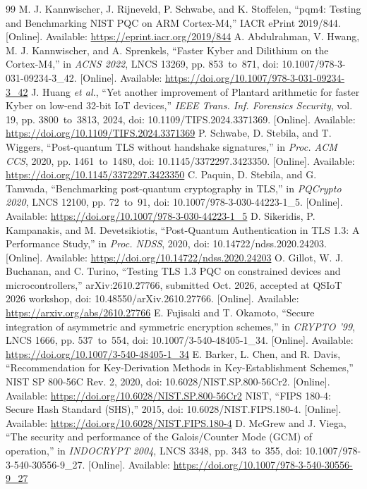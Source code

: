 \documentclass[pdflatex,sn-mathphys-num]{sn-jnl}
\begin{document}
\begin{thebibliography}{99}
 M. J. Kannwischer, J. Rijneveld, P. Schwabe, and K. Stoffelen, ``pqm4: Testing and Benchmarking NIST PQC on ARM Cortex-M4,'' IACR ePrint 2019/844. [Online]. Available: \url{https://eprint.iacr.org/2019/844}
 A. Abdulrahman, V. Hwang, M. J. Kannwischer, and A. Sprenkels, ``Faster Kyber and Dilithium on the Cortex-M4,'' in \textit{ACNS 2022}, LNCS 13269, pp. 853~to~871, doi: 10.1007/978-3-031-09234-3\_42. [Online]. Available: \url{https://doi.org/10.1007/978-3-031-09234-3_42}
 J. Huang \textit{et al.}, ``Yet another improvement of Plantard arithmetic for faster Kyber on low-end 32-bit IoT devices,'' \textit{IEEE Trans. Inf. Forensics Security}, vol. 19, pp. 3800~to~3813, 2024, doi: 10.1109/TIFS.2024.3371369. [Online]. Available: \url{https://doi.org/10.1109/TIFS.2024.3371369}
 P. Schwabe, D. Stebila, and T. Wiggers, ``Post-quantum TLS without handshake signatures,'' in \textit{Proc. ACM CCS}, 2020, pp. 1461~to~1480, doi: 10.1145/3372297.3423350. [Online]. Available: \url{https://doi.org/10.1145/3372297.3423350}
 C. Paquin, D. Stebila, and G. Tamvada, ``Benchmarking post-quantum cryptography in TLS,'' in \textit{PQCrypto 2020}, LNCS 12100, pp. 72~to~91, doi: 10.1007/978-3-030-44223-1\_5. [Online]. Available: \url{https://doi.org/10.1007/978-3-030-44223-1_5}
 D. Sikeridis, P. Kampanakis, and M. Devetsikiotis, ``Post-Quantum Authentication in TLS 1.3: A Performance Study,'' in \textit{Proc. NDSS}, 2020, doi: 10.14722/ndss.2020.24203. [Online]. Available: \url{https://doi.org/10.14722/ndss.2020.24203}
 O. Gillot, W. J. Buchanan, and C. Turino, ``Testing TLS 1.3 PQC on constrained devices and microcontrollers,'' arXiv:2610.27766, submitted Oct. 2026, accepted at QSIoT 2026 workshop, doi: 10.48550/arXiv.2610.27766. [Online]. Available: \url{https://arxiv.org/abs/2610.27766}
 E. Fujisaki and T. Okamoto, ``Secure integration of asymmetric and symmetric encryption schemes,'' in \textit{CRYPTO '99}, LNCS 1666, pp. 537~to~554, doi: 10.1007/3-540-48405-1\_34. [Online]. Available: \url{https://doi.org/10.1007/3-540-48405-1_34}
 E. Barker, L. Chen, and R. Davis, ``Recommendation for Key-Derivation Methods in Key-Establishment Schemes,'' NIST SP 800-56C Rev. 2, 2020, doi: 10.6028/NIST.SP.800-56Cr2. [Online]. Available: \url{https://doi.org/10.6028/NIST.SP.800-56Cr2}
 NIST, ``FIPS 180-4: Secure Hash Standard (SHS),'' 2015, doi: 10.6028/NIST.FIPS.180-4. [Online]. Available: \url{https://doi.org/10.6028/NIST.FIPS.180-4}
 D. McGrew and J. Viega, ``The security and performance of the Galois/Counter Mode (GCM) of operation,'' in \textit{INDOCRYPT 2004}, LNCS 3348, pp. 343~to~355, doi: 10.1007/978-3-540-30556-9\_27. [Online]. Available: \url{https://doi.org/10.1007/978-3-540-30556-9_27}

\end{thebibliography}
\end{document}
